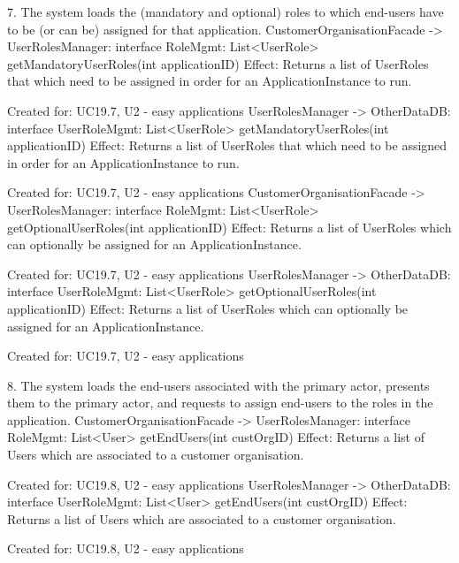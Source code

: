 {{{            7. The system loads the (mandatory and optional) roles to which end-users have to be (or can be) assigned for that application.
                    CustomerOrganisationFacade -> UserRolesManager: interface RoleMgmt:     List<UserRole> getMandatoryUserRoles(int applicationID)
                        Effect: Returns a list of UserRoles that which need to be assigned in order for an ApplicationInstance to run.
                        \item Created for: UC19.7, U2 - easy applications
                    UserRolesManager -> OtherDataDB:                interface UserRoleMgmt: List<UserRole> getMandatoryUserRoles(int applicationID)
                        Effect: Returns a list of UserRoles that which need to be assigned in order for an ApplicationInstance to run.
                        \item Created for: UC19.7, U2 - easy applications
                    CustomerOrganisationFacade -> UserRolesManager: interface RoleMgmt:     List<UserRole> getOptionalUserRoles(int applicationID)
                        Effect: Returns a list of UserRoles which can optionally be assigned for an ApplicationInstance.
                        \item Created for: UC19.7, U2 - easy applications
                    UserRolesManager -> OtherDataDB:                interface UserRoleMgmt: List<UserRole> getOptionalUserRoles(int applicationID)
                        Effect: Returns a list of UserRoles which can optionally be assigned for an ApplicationInstance.
                        \item Created for: UC19.7, U2 - easy applications

            8. The system loads the end-users associated with the primary actor, presents them to the primary actor, and requests to assign end-users to the roles in the application.
                    CustomerOrganisationFacade -> UserRolesManager: interface RoleMgmt:     List<User> getEndUsers(int custOrgID)
                        Effect: Returns a list of Users which are associated to a customer organisation.
                        \item Created for: UC19.8, U2 - easy applications
                    UserRolesManager -> OtherDataDB:                interface UserRoleMgmt: List<User> getEndUsers(int custOrgID)
                        Effect: Returns a list of Users which are associated to a customer organisation.
                        \item Created for: UC19.8, U2 - easy applications

}}}
